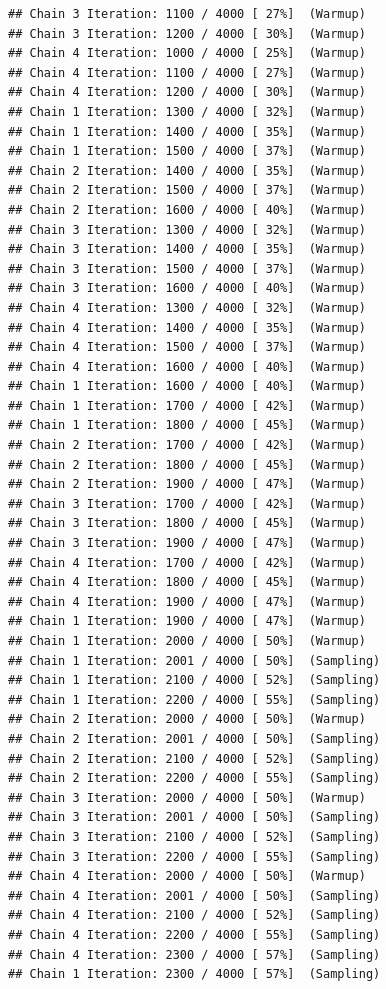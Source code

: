 \documentclass[
]{article}
\begin{document}
\begin{verbatim}
## Chain 3 Iteration: 1100 / 4000 [ 27%]  (Warmup) 
## Chain 3 Iteration: 1200 / 4000 [ 30%]  (Warmup) 
## Chain 4 Iteration: 1000 / 4000 [ 25%]  (Warmup) 
## Chain 4 Iteration: 1100 / 4000 [ 27%]  (Warmup) 
## Chain 4 Iteration: 1200 / 4000 [ 30%]  (Warmup) 
## Chain 1 Iteration: 1300 / 4000 [ 32%]  (Warmup) 
## Chain 1 Iteration: 1400 / 4000 [ 35%]  (Warmup) 
## Chain 1 Iteration: 1500 / 4000 [ 37%]  (Warmup) 
## Chain 2 Iteration: 1400 / 4000 [ 35%]  (Warmup) 
## Chain 2 Iteration: 1500 / 4000 [ 37%]  (Warmup) 
## Chain 2 Iteration: 1600 / 4000 [ 40%]  (Warmup) 
## Chain 3 Iteration: 1300 / 4000 [ 32%]  (Warmup) 
## Chain 3 Iteration: 1400 / 4000 [ 35%]  (Warmup) 
## Chain 3 Iteration: 1500 / 4000 [ 37%]  (Warmup) 
## Chain 3 Iteration: 1600 / 4000 [ 40%]  (Warmup) 
## Chain 4 Iteration: 1300 / 4000 [ 32%]  (Warmup) 
## Chain 4 Iteration: 1400 / 4000 [ 35%]  (Warmup) 
## Chain 4 Iteration: 1500 / 4000 [ 37%]  (Warmup) 
## Chain 4 Iteration: 1600 / 4000 [ 40%]  (Warmup) 
## Chain 1 Iteration: 1600 / 4000 [ 40%]  (Warmup) 
## Chain 1 Iteration: 1700 / 4000 [ 42%]  (Warmup) 
## Chain 1 Iteration: 1800 / 4000 [ 45%]  (Warmup) 
## Chain 2 Iteration: 1700 / 4000 [ 42%]  (Warmup) 
## Chain 2 Iteration: 1800 / 4000 [ 45%]  (Warmup) 
## Chain 2 Iteration: 1900 / 4000 [ 47%]  (Warmup) 
## Chain 3 Iteration: 1700 / 4000 [ 42%]  (Warmup) 
## Chain 3 Iteration: 1800 / 4000 [ 45%]  (Warmup) 
## Chain 3 Iteration: 1900 / 4000 [ 47%]  (Warmup) 
## Chain 4 Iteration: 1700 / 4000 [ 42%]  (Warmup) 
## Chain 4 Iteration: 1800 / 4000 [ 45%]  (Warmup) 
## Chain 4 Iteration: 1900 / 4000 [ 47%]  (Warmup) 
## Chain 1 Iteration: 1900 / 4000 [ 47%]  (Warmup) 
## Chain 1 Iteration: 2000 / 4000 [ 50%]  (Warmup) 
## Chain 1 Iteration: 2001 / 4000 [ 50%]  (Sampling) 
## Chain 1 Iteration: 2100 / 4000 [ 52%]  (Sampling) 
## Chain 1 Iteration: 2200 / 4000 [ 55%]  (Sampling) 
## Chain 2 Iteration: 2000 / 4000 [ 50%]  (Warmup) 
## Chain 2 Iteration: 2001 / 4000 [ 50%]  (Sampling) 
## Chain 2 Iteration: 2100 / 4000 [ 52%]  (Sampling) 
## Chain 2 Iteration: 2200 / 4000 [ 55%]  (Sampling) 
## Chain 3 Iteration: 2000 / 4000 [ 50%]  (Warmup) 
## Chain 3 Iteration: 2001 / 4000 [ 50%]  (Sampling) 
## Chain 3 Iteration: 2100 / 4000 [ 52%]  (Sampling) 
## Chain 3 Iteration: 2200 / 4000 [ 55%]  (Sampling) 
## Chain 4 Iteration: 2000 / 4000 [ 50%]  (Warmup) 
## Chain 4 Iteration: 2001 / 4000 [ 50%]  (Sampling) 
## Chain 4 Iteration: 2100 / 4000 [ 52%]  (Sampling) 
## Chain 4 Iteration: 2200 / 4000 [ 55%]  (Sampling) 
## Chain 4 Iteration: 2300 / 4000 [ 57%]  (Sampling) 
## Chain 1 Iteration: 2300 / 4000 [ 57%]  (Sampling) 

\end{verbatim}
\end{document}
